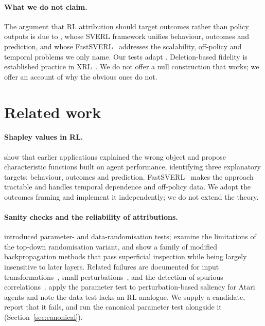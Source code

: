 \documentclass[10pt,twocolumn]{article}
\newcommand{\elsewhere}[1]{Section~\ref{#1}}
\begin{document}
\paragraph{What we do not claim.}
The argument that RL attribution should target outcomes rather than policy
outputs is due to \citet{beechey2023sverl}, whose SVERL framework unifies
behaviour, outcomes and prediction, and whose
FastSVERL~\citep{beechey2025fastsverl} addresses the scalability, off-policy and
temporal problems we only name. Our tests adapt \citet{adebayo2018sanity}.
Deletion-based fidelity is established practice in
XRL~\citep{cheng2025survey,milani2024xrl}. We do not offer a null construction
that works; we offer an account of why the obvious ones do not.

\section{Related work}

\paragraph{Shapley values in RL.}
\citet{beechey2023sverl} show that earlier applications explained the wrong
object and propose characteristic functions built on agent performance,
identifying three explanatory targets: behaviour, outcomes and prediction.
FastSVERL~\citep{beechey2025fastsverl} makes the approach tractable and handles
temporal dependence and off-policy data. We adopt the outcomes framing and
implement it independently; we do not extend the theory.

\paragraph{Sanity checks and the reliability of attributions.}
\citet{adebayo2018sanity} introduced parameter- and data-randomisation tests;
\citet{binder2023shortcomings} examine the limitations of the top-down
randomisation variant, and \citet{sixt2020lie} show a family of modified
backpropagation methods that pass superficial inspection while being largely
insensitive to later layers. Related failures are documented for input
transformations~\citep{kindermans2019unreliability}, small
perturbations~\citep{ghorbani2019fragile}, and the detection of spurious
correlations~\citep{adebayo2022spurious}. \citet{huber2022benchmarking} apply the
parameter test to perturbation-based saliency for Atari agents and note the data
test lacks an RL analogue. We supply a candidate, report that it fails, and run the canonical parameter
test alongside it (\elsewhere{sec:canonical}).
\end{document}
